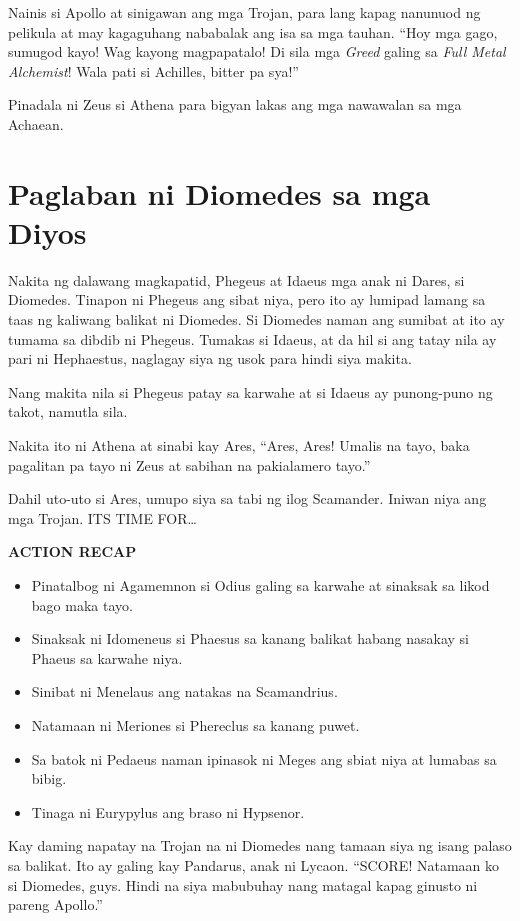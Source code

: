 \documentclass[12pt,letterpaper]{report}
\newenvironment{recap}{\begin{center}{\large\textbf{ACTION RECAP}}\begin{itemize}}{\end{itemize}\end{center}}
\begin{document}
Nainis si Apollo at sinigawan ang mga Trojan, para lang kapag nanunuod ng pelikula at may kagaguhang nababalak ang isa sa mga tauhan. ``Hoy mga gago, sumugod kayo! Wag kayong magpapatalo! Di sila mga \textit{Greed} galing sa \textit{Full Metal Alchemist}! Wala pati si Achilles, bitter pa sya!''

Pinadala ni Zeus si Athena para bigyan lakas ang mga nawawalan sa mga Achaean.

\pagebreak
\chapter{Paglaban ni Diomedes sa mga Diyos}

Nakita ng dalawang magkapatid, Phegeus at Idaeus mga anak ni Dares, si Diomedes. Tinapon ni Phegeus ang sibat niya, pero ito ay lumipad lamang sa taas ng kaliwang balikat ni Diomedes. Si Diomedes naman ang sumibat at ito ay tumama sa dibdib ni Phegeus. Tumakas si Idaeus, at da   hil si ang tatay nila ay pari ni Hephaestus, naglagay siya ng usok para hindi siya makita.

Nang makita nila si Phegeus patay sa karwahe at si Idaeus ay punong-puno ng takot, namutla sila.

Nakita ito ni Athena at sinabi kay Ares, ``Ares, Ares! Umalis na tayo, baka pagalitan pa tayo ni Zeus at sabihan na pakialamero tayo.''

Dahil uto-uto si Ares, umupo siya sa tabi ng ilog Scamander. Iniwan niya ang mga Trojan. ITS TIME FOR\dots

\begin{recap}
    \item Pinatalbog ni Agamemnon si Odius galing sa karwahe at sinaksak sa likod bago maka tayo.
    \item Sinaksak ni Idomeneus si Phaesus sa kanang balikat habang nasakay si Phaeus sa karwahe niya.
    \item Sinibat ni Menelaus ang natakas na Scamandrius.
    \item Natamaan ni Meriones si Phereclus sa kanang puwet.
    \item Sa batok ni Pedaeus naman ipinasok ni Meges ang sbiat niya at lumabas sa bibig.
    \item Tinaga ni Eurypylus ang braso ni Hypsenor.
\end{recap}

Kay daming napatay na Trojan na ni Diomedes nang tamaan siya ng isang palaso sa balikat. Ito ay galing kay Pandarus, anak ni Lycaon. ``SCORE! Natamaan ko si Diomedes, guys. Hindi na siya mabubuhay nang matagal kapag ginusto ni pareng Apollo.''
\end{document}
